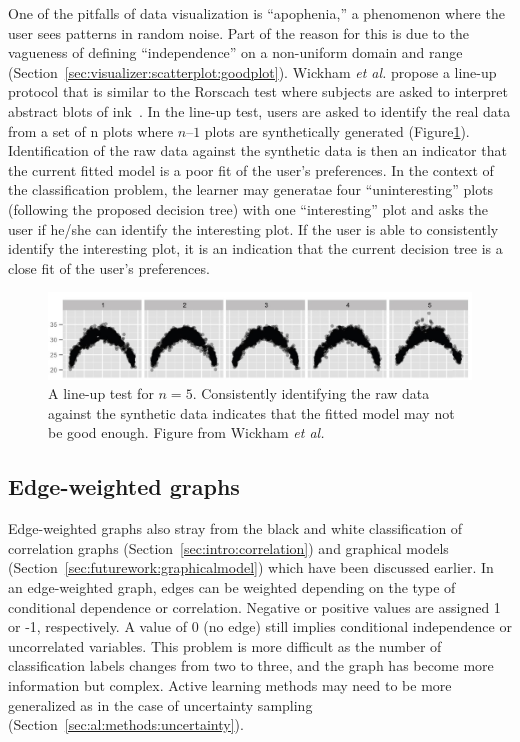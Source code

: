One of the pitfalls of data visualization is ``apophenia,'' a phenomenon where
the user sees patterns in random noise. Part of the reason for this is due to
the vagueness of defining ``independence'' on a non-uniform domain and range
(Section~\ref{sec:visualizer:scatterplot:goodplot}). Wickham \textit{et al.} 
propose a line-up protocol that is similar to the Rorscach test where subjects 
are asked to interpret abstract blots of ink~\cite{wickham2010}. 
In the line-up test,
users are asked to identify the real data from a set of n plots where $n – 1$
plots are synthetically generated (Figure\ref{fig:visualizer:lineup}). 
Identification of the raw data against the synthetic data is then an indicator 
that the current fitted model is a poor fit of the user's preferences.
In the context of the classification problem, the learner may generatae
four ``uninteresting'' plots (following the proposed decision tree) with one
``interesting'' plot and asks the user if he/she can identify the interesting
plot. If the user is able to consistently identify the interesting plot, it is
an indication that the current decision tree is a close fit of the user’s
preferences.

\begin{figure}[H]
	\begin{center}
		\includegraphics[width=1\linewidth]{ch-conclusion/figures/lineup}
		\caption[A line-up test for $n = 5$. ]{A line-up test for $n = 5$.
			Consistently identifying the raw data against the synthetic data 
			indicates that
			the fitted model may not be good enough. Figure from Wickham 
			\textit{et al.}~\cite{wickham2010}}
		\label{fig:visualizer:lineup}
	\end{center}
\end{figure}

\subsection{Edge-weighted graphs}
\label{sec:futurework:edgeweighted}

Edge-weighted graphs also stray from the black and white classification of 
correlation graphs (Section~\ref{sec:intro:correlation}) and graphical models 
(Section~\ref{sec:futurework:graphicalmodel}) which have been discussed 
earlier. In an edge-weighted graph, edges can be weighted depending
on the type of conditional dependence or correlation. Negative or positive 
values are assigned 1 or -1, respectively. A value of 0 (no edge) still implies 
conditional independence or uncorrelated variables. This problem is more 
difficult as the number of classification labels changes from two to three, and 
the graph has become more information but complex. 
Active learning methods may need to be more generalized as in the case of 
uncertainty sampling (Section~\ref{sec:al:methods:uncertainty}). 

